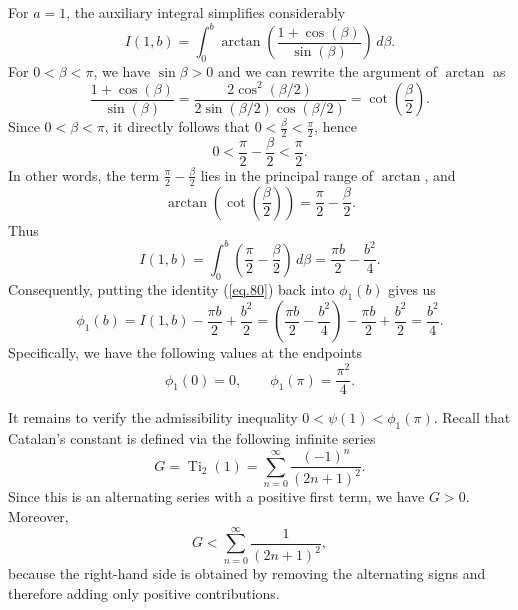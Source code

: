 \documentclass[preprint,12pt,nopreprintline]{elsarticle}
\begin{document}
For \(a=1\), the auxiliary integral simplifies considerably
\begin{equation}
I(1,b)=\int_0^b \arctan\!\left(\frac{1+\cos\left(\beta\right)}{\sin\left(\beta\right)}\right)\,d\beta.
\end{equation}
For \(0<\beta<\pi\), we have \(\sin\beta>0\) and we can rewrite the argument of \(\arctan\) as
\begin{equation}
\frac{1+\cos\left(\beta\right)}{\sin\left(\beta\right)}
=
\frac{2\cos^2(\beta/2)}{2\sin(\beta/2)\cos(\beta/2)}
=
\cot\!\left(\frac{\beta}{2}\right).
\end{equation}
Since \(0<\beta<\pi\), it directly follows that \(0<\frac{\beta}{2}<\frac{\pi}{2}\), hence
\begin{equation}
0<\frac{\pi}{2}-\frac{\beta}{2}<\frac{\pi}{2}.
\end{equation}
In other words, the term \(\frac{\pi}{2}-\frac{\beta}{2}\) lies in the principal range of \(\arctan\), and
\begin{equation}
\arctan\!\left(\cot\!\left(\frac{\beta}{2}\right)\right)
=
\frac{\pi}{2}-\frac{\beta}{2}.
\end{equation}
Thus
\begin{equation}\label{eq.80}
I(1,b)
=
\int_0^b \left(\frac{\pi}{2}-\frac{\beta}{2}\right)\,d\beta
=
\frac{\pi b}{2}-\frac{b^2}{4}.
\end{equation}
Consequently, putting the identity (\ref{eq.80}) back into \(\phi_1\left
(b\right)\) gives us
\begin{equation}
\phi_1(b)
=
I(1,b)-\frac{\pi b}{2}+\frac{b^2}{2}
=
\left(\frac{\pi b}{2}-\frac{b^2}{4}\right)-\frac{\pi b}{2}+\frac{b^2}{2}
=
\frac{b^2}{4}.
\end{equation}
Specifically, we have the following values at the endpoints
\begin{equation}
\phi_1(0)=0,
\qquad
\phi_1(\pi)=\frac{\pi^2}{4}.
\tag{4.15}
\end{equation}

It remains to verify the admissibility inequality \(0<\psi(1)<\phi_1(\pi)\). Recall that Catalan’s constant is defined via the following infinite series
\begin{equation}
G=\operatorname{Ti}_2(1)=\sum_{n=0}^\infty \frac{(-1)^n}{(2n+1)^2}.
\end{equation}
Since this is an alternating series with a positive first term, we have \(G>0\).
Moreover,
\begin{equation}
G
<
\sum_{n=0}^\infty \frac{1}{(2n+1)^2},
\end{equation}
because the right-hand side is obtained by removing the alternating signs and therefore
adding only positive contributions.
\end{document}
